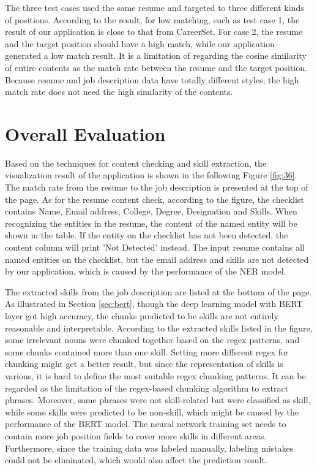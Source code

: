 The three test cases used the same resume and targeted to three different kinds of positions. According to the result, for low matching, such as test case 1, the result of our application is close to that from CareerSet. For case 2, the resume and the target position should have a high match, while our application generated a low match result. It is a limitation of regarding the cosine similarity of entire contents as the match rate between the resume and the target position. Because resume and job description data have totally different styles, the high match rate does not need the high similarity of the contents. 


\section{Overall Evaluation}
\label{sec:visual}



Based on the techniques for content checking and skill extraction, the visualization result of the application is shown in the following Figure \ref{fig:36}. The match rate from the resume to the job description is presented at the top of the page. As for the resume content check, according to the figure, the checklist contains Name, Email address, College, Degree, Designation and Skills. When recognizing the entities in the resume, the content of the named entity will be shown in the table. If the entity on the checklist has not been detected, the content column will print 'Not Detected' instead. The input resume contains all named entities on the checklist, but the email address and skills are not detected by our application, which is caused by the performance of the NER model. 

The extracted skills from the job description are listed at the bottom of the page. As illustrated in Section \ref{sec:bert}, though the deep learning model with BERT layer got high accuracy, the chunks predicted to be skills are not entirely reasonable and interpretable. According to the extracted skills listed in the figure, some irrelevant nouns were chunked together based on the regex patterns, and some chunks contained more than one skill. Setting more different regex for chunking might get a better result, but since the representation of skills is various, it is hard to define the most suitable regex chunking patterns. It can be regarded as the limitation of the regex-based chunking algorithm to extract phrases. Moreover, some phrases were not skill-related but were classified as skill, while some skills were predicted to be non-skill, which might be caused by the performance of the BERT model. The neural network training set needs to contain more job position fields to cover more skills in different areas. Furthermore, since the training data was labeled manually, labeling mistakes could not be eliminated, which would also affect the prediction result.


